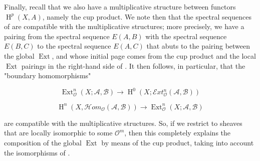 Finally, recall that we also have a multiplicative structure between functors $\operatorname{H}^p(X,A)$, namely the cup product.
We note then that the spectral sequences of  are compatible with the multiplicative structures;
more precisely, we have a pairing from the spectral sequence $E(A,B)$ with the spectral sequence $E(B,C)$ to the spectral sequence $E(A,C)$ that abuts to the pairing between the global $\operatorname{Ext}$, and whose initial page comes from the cup product and the local $\operatorname{Ext}$ pairings in the right-hand side of .
It then follows, in particular, that the "boundary homomorphisms"


\begin{equation}\tag{2.6}\label{fga1-equation-2.6}
  \operatorname{Ext}_\mathcal{O}^n(X;\mathcal{A},\mathcal{B}) \to \operatorname{H}^0(X;\mathcal{E}xt_\mathcal{O}^n(\mathcal{A},\mathcal{B}))
\end{equation}

\begin{equation}\tag{2.7}\label{fga1-equation-2.7}
  \operatorname{H}^n(X,\mathcal{H}om_\mathcal{O}(\mathcal{A},\mathcal{B})) \to \operatorname{Ext}_\mathcal{O}^n(X;\mathcal{A},\mathcal{B})
\end{equation}


are compatible with the multiplicative structures.
So, if we restrict to sheaves that are locally isomorphic to some $\mathcal{O}^m$, then this completely explains the composition of the global $\operatorname{Ext}$ by means of the cup product, taking into account the isomorphisms of .

